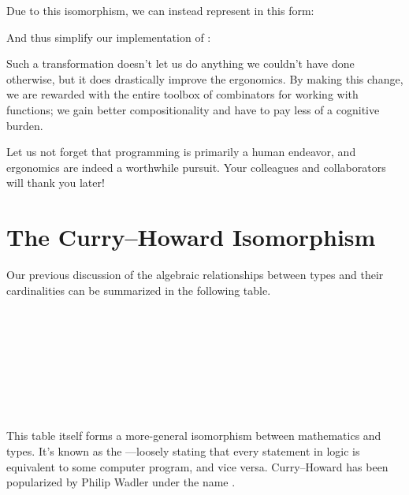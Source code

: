 \documentclass[book.tex]{subfiles}
\begin{document}

Due to this isomorphism, we can instead represent  in this form:


And thus simplify our implementation of :


Such a transformation doesn't let us do anything we couldn't have done
otherwise, but it does drastically improve the ergonomics. By making this
change, we are rewarded with the entire toolbox of combinators for working with
functions; we gain better compositionality and have to pay less of a cognitive
burden.

Let us not forget that programming is primarily a human endeavor, and ergonomics
are indeed a worthwhile pursuit. Your colleagues and collaborators will thank
you later!


\section{The Curry--Howard Isomorphism}

Our previous discussion of the algebraic relationships between types and their
cardinalities can be summarized in the following table.

\spaceMyBox
\begin{myTable}
\hline
   \\ \hline
   \\ \hline
   \\ \hline
   \\ \hline
   \\ \hline
   \\ \hline
   \\ \hline
\end{myTable}
\spaceMyBox

This table itself forms a more-general isomorphism between mathematics and
types. It's known as the ---loosely stating
that every statement in logic is equivalent to some computer program, and vice
versa. Curry--Howard has been popularized by Philip Wadler under the name
.
\end{document}
